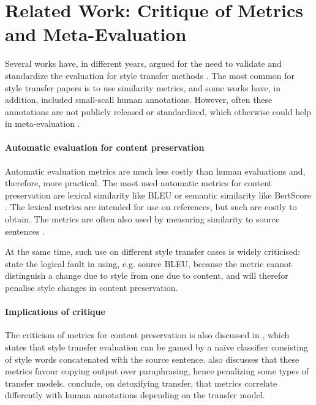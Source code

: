 \section{Related Work: Critique of Metrics and Meta-Evaluation}
\label{sec:relatedwork}
Several works have, in different years, argued for the need to validate and standardize the evaluation for style transfer methods \cite{ostheimer-etal-2023-call,briakou-etal-2021-review, mir-etal-2019-evaluating}. The most common for style transfer papers is to use similarity metrics, and some works have, in addition, included small-scall human annotations. However, often these annotations are not publicly released or standardized, which otherwise could help in meta-evaluation  \cite{briakou-etal-2021-review}.  

\paragraph{Automatic evaluation for content preservation}
Automatic evaluation metrics are much less costly than human evaluations and, therefore, more practical. The most used automatic metrics for content preservation are lexical similarity like BLEU \cite{papineni-etal-2002-bleu} or semantic similarity like BertScore \cite{zhang2019bertscore}. The lexical metrics are intended for use on references, but such are costly to obtain. The metrics are often also used by measuring similarity to source sentences \cite{hu2022text,lai-etal-2022-human}. 

At the same time, such use on different style transfer cases is widely criticised:  \citet{mir-etal-2019-evaluating}  state the logical fault in using, e.g. source BLEU, because the metric cannot distinguish a change due to style from one due to content, and will therefor penalise style changes in content preservation.

\paragraph{Implications of critique}
The criticism of metrics for content preservation is also discussed in \citet{cao-etal-2020-expertise}, which states that style transfer evaluation can be gamed by a naïve classifier consisting of style words concatenated with the source sentence. \citet{lai-etal-2024-style}  also discusses that these metrics favour copying output over paraphrasing, hence penalizing some types of transfer models.  \citet{logacheva-etal-2022-study} conclude, on detoxifying transfer, that metrics correlate differently with human annotations depending on the transfer model. 

